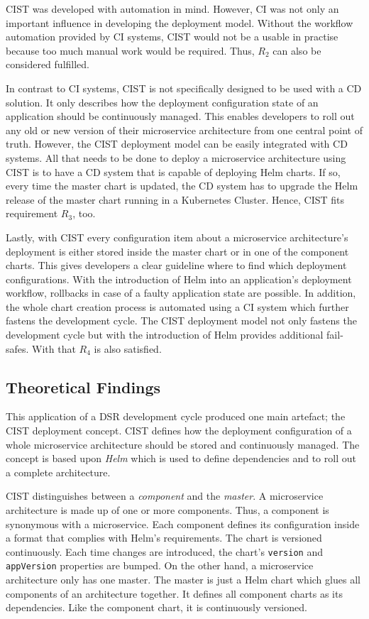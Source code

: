 \ac{CIST} was developed with automation in mind. However, \ac{CI} was not only
an important influence in developing the deployment model. Without the workflow
automation provided by \ac{CI} systems, \ac{CIST} would not be a usable in
practise because too much manual work would be required. Thus, $R_2$ can also be
considered fulfilled.

In contrast to \ac{CI} systems, \ac{CIST} is not specifically designed to be
used with a \ac{CD} solution. It only describes how the deployment
configuration state of an application should be continuously managed. This
enables developers to roll out any old or new version of their microservice
architecture from one central point of truth. However, the \ac{CIST} deployment
model can be easily integrated with \ac{CD} systems. All that needs to be done
to deploy a microservice architecture using \ac{CIST} is to have a \ac{CD}
system that is capable of deploying Helm charts. If so, every time the master
chart is updated, the \ac{CD} system has to upgrade the Helm release of the
master chart running in a Kubernetes Cluster. Hence, \ac{CIST} fits requirement
$R_3$, too.

Lastly, with \ac{CIST} every configuration item about a microservice
architecture's deployment is either stored inside the master chart or in one of
the component charts. This gives developers a clear guideline where to find
which deployment configurations. With the introduction of Helm into an
application's deployment workflow, rollbacks in case of a faulty application
state are possible. In addition, the whole chart creation process is automated
using a \ac{CI} system which further fastens the development cycle. The
\ac{CIST} deployment model not only fastens the development cycle but with the
introduction of Helm provides additional fail-safes. With that $R_4$ is also
satisfied.

\subsection{Theoretical Findings}%
\label{sub:Theoretical_Findings}

This application of a \ac{DSR} development cycle produced one main artefact;
the \ac{CIST} deployment concept. \ac{CIST} defines how the deployment
configuration of a whole microservice architecture should be stored and
continuously managed. The concept is based upon \textit{Helm} which is used to
define dependencies and to roll out a complete architecture.

\ac{CIST} distinguishes between a \textit{component} and the \textit{master}. A
microservice architecture is made up of one or more components. Thus, a
component is synonymous with a microservice. Each component defines its
configuration inside a format that complies with Helm's requirements. The chart
is versioned continuously. Each time changes are introduced, the chart's
\texttt{version} and \texttt{appVersion} properties are bumped. On the other
hand, a microservice architecture only has one master. The master is just a
Helm chart which glues all components of an architecture together. It defines
all component charts as its dependencies. Like the component chart, it is
continuously versioned.


